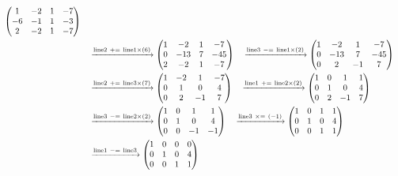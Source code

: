 \documentclass{ltjsarticle}
\begin{document}
\begin{align*}
 \begin{pmatrix}
 1 & - 2 & 1 & - 7\\
 - 6 & -1 & 1 & - 3\\
 2 & - 2 & 1 & - 7
\end{pmatrix}\allowdisplaybreaks\\
&\ \ \ \xrightarrow{ \text{line} 2 \ +=\  \text{line} 1 \times\left( 6 \right)} %
\begin{pmatrix}
 1 & - 2 & 1 & - 7\\
 0 & - 13 & 7 & - 45\\
 2 & - 2 & 1 & - 7
\end{pmatrix}\ \ \ \xrightarrow{ \text{line} 3 \ -=\  \text{line} 1 \times\left( 2 \right)} %
\begin{pmatrix}
 1 & - 2 & 1 & - 7\\
 0 & - 13 & 7 & - 45\\
 0 & 2 & -1 & 7
\end{pmatrix}\allowdisplaybreaks\\
&\ \ \ \xrightarrow{ \text{line} 2 \ +=\  \text{line} 3 \times\left( 7 \right)} %
\begin{pmatrix}
 1 & - 2 & 1 & - 7\\
 0 & 1 & 0 & 4\\
 0 & 2 & -1 & 7
\end{pmatrix}\ \ \ \xrightarrow{ \text{line} 1 \ +=\  \text{line} 2 \times\left( 2 \right)} %
\begin{pmatrix}
 1 & 0 & 1 & 1\\
 0 & 1 & 0 & 4\\
 0 & 2 & -1 & 7
\end{pmatrix}\allowdisplaybreaks\\
&\ \ \ \xrightarrow{ \text{line} 3 \ -=\  \text{line} 2 \times\left( 2 \right)} %
\begin{pmatrix}
 1 & 0 & 1 & 1\\
 0 & 1 & 0 & 4\\
 0 & 0 & -1 & -1
\end{pmatrix}\ \ \ \xrightarrow{ \text{line} 3 \ \times=\ \left( - 1 \right)} %
\begin{pmatrix}
 1 & 0 & 1 & 1\\
 0 & 1 & 0 & 4\\
 0 & 0 & 1 & 1
\end{pmatrix}\allowdisplaybreaks\\
&\ \ \ \xrightarrow{ \text{line} 1 \ -=\  \text{line} 3 } %
\begin{pmatrix}
 1 & 0 & 0 & 0\\
 0 & 1 & 0 & 4\\
 0 & 0 & 1 & 1
\end{pmatrix}
\end{align*}
\end{document}
